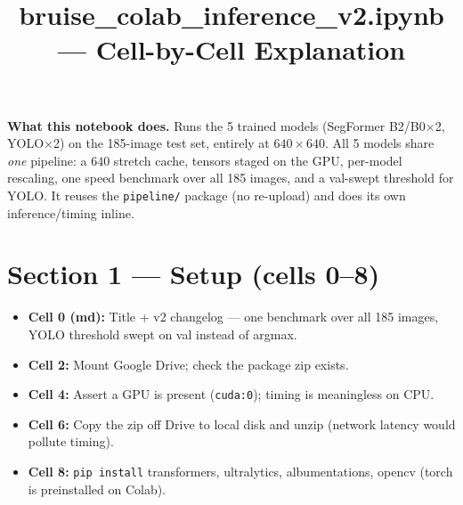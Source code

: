 \documentclass[11pt]{article}
\title{\vspace{-1.5em}\textbf{bruise\_colab\_inference\_v2.ipynb --- Cell-by-Cell Explanation}}
\author{}
\date{}
\newcommand{\code}[1]{\texttt{\small #1}}
\begin{document}
\maketitle
\vspace{-2.5em}

\noindent\textbf{What this notebook does.} Runs the 5 trained models (SegFormer B2/B0$\times$2, YOLO$\times$2)
on the 185-image test set, entirely at $640\times640$. All 5 models share \emph{one} pipeline: a
$640$ stretch cache, tensors staged on the GPU, per-model rescaling, one speed benchmark over all
185 images, and a val-swept threshold for YOLO. It reuses the \code{pipeline/} package
(no re-upload) and does its own inference/timing inline.

\section*{Section 1 --- Setup (cells 0--8)}
\begin{itemize}
\item \textbf{Cell 0 (md):} Title + v2 changelog --- one benchmark over all 185 images, YOLO threshold swept on val instead of argmax.
\item \textbf{Cell 2:} Mount Google Drive; check the package zip exists.
\item \textbf{Cell 4:} Assert a GPU is present (\code{cuda:0}); timing is meaningless on CPU.
\item \textbf{Cell 6:} Copy the zip off Drive to local disk and unzip (network latency would pollute timing).
\item \textbf{Cell 8:} \code{pip install} transformers, ultralytics, albumentations, opencv (torch is preinstalled on Colab).
\end{itemize}
\end{document}
